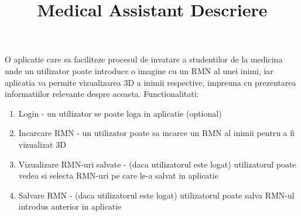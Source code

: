 \documentclass[12pt, letterpaper]{article}
\title{Medical Assistant Descriere}
\begin{document}
\maketitle

O aplicatie care sa faciliteze procesul de invatare a studentilor de la medicina unde un utilizator poate introduce o imagine cu un RMN al unei inimi, iar aplicatia va permite vizualizarea 3D a inimii respective, impreuna cu prezentarea informatiilor relevante despre aceasta.
Functionalitati:
\begin{enumerate}
	\item Login - un utilizator se poate loga in aplicatie  (optional)
	\item Incarcare RMN - un utilizator poate sa incarce un RMN al inimii pentru a fi vizualizat 3D
	\item Vizualizare RMN-uri salvate - (daca utilizatorul este logat) utilizatorul poate vedea si selecta RMN-uri pe care le-a salvat in aplicatie
	\item Salvare RMN - (daca utilizatorul este logat) utilizatorul poate salva RMN-ul introdus anterior in aplicatie
\end{enumerate}
\end{document}
